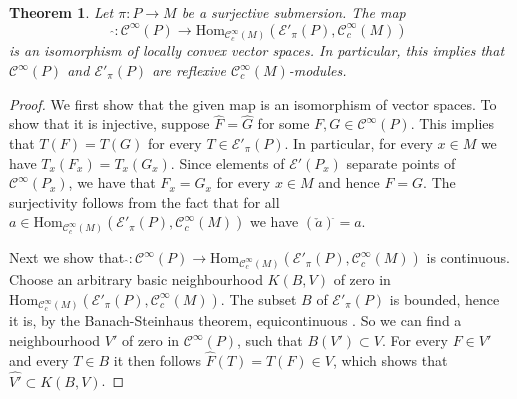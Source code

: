 \documentclass[a4paper]{amsart}
\newtheorem{theo}[dfn]{Theorem}
\newcommand{\cE}{\mathcal{E}}
\newcommand{\Hom}{\text{Hom}}
\newcommand{\C}{\mathord{\mathcal{C}^{\infty}}}
\newcommand{\Cc}{\mathord{\mathcal{C}^{\infty}_{c}}}
\begin{document}
\begin{theo}
Let $\pi:P\to M$ be a surjective submersion. The map
\[
\hat{}:\C(P)\to\Hom_{\Cc(M)}(\cE'_{\pi}(P),\Cc(M))
\]
is an isomorphism of locally convex vector spaces. In particular, this implies that $\C(P)$ and $\cE'_{\pi}(P)$
are reflexive $\Cc(M)$-modules.
\end{theo}
\begin{proof}
We first show that the given map is an isomorphism of vector spaces. To show that it is injective, 
suppose $\hat{F}=\hat{G}$ for some $F,G\in\C(P)$. This implies
that $T(F)=T(G)$ for every $T\in\cE'_{\pi}(P)$. In particular, for every $x\in M$ we have $T_{x}(F_{x})=T_{x}(G_{x})$.
Since elements of $\cE'(P_{x})$ separate points of $\C(P_{x})$, we have that $F_{x}=G_{x}$ for every $x\in M$ and hence $F=G$.
The surjectivity follows from the fact that for all $a\in\Hom_{\Cc(M)}(\cE'_{\pi}(P),\Cc(M))$ we have $(\check{a})^{\hat{}}=a$.  

Next we show that $\hat{}:\C(P)\to\Hom_{\Cc(M)}(\cE'_{\pi}(P),\Cc(M))$ is continuous.
Choose an arbitrary basic neighbourhood
$K(B,V)$ of zero in $\Hom_{\Cc(M)}(\cE'_{\pi}(P),\Cc(M))$. The subset $B$ of $\cE'_{\pi}(P)$ is bounded, hence it
is, by the Banach-Steinhaus theorem, equicontinuous . So we can find a neighbourhood $V'$ of zero in $\C(P)$,
such that $B(V')\subset V$. For every $F\in V'$ and every $T\in B$ it then follows $\hat{F}(T)=T(F)\in V$, which shows that
$\widehat{V'}\subset K(B,V)$.


\end{proof}
\end{document}
